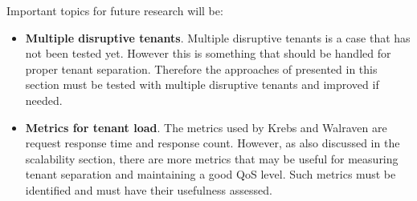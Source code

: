 Important topics for future research will be:
\begin{itemize}
	\item \textbf{Multiple disruptive tenants}.
		Multiple disruptive tenants is a case that has not been tested yet. 
		However this is something that should be handled for proper tenant separation.
		Therefore the approaches of presented in this section must be tested with multiple disruptive tenants and improved if needed.
	\item \textbf{Metrics for tenant load}.
		The metrics used by Krebs and Walraven are request response time and response count. 
		However, as also discussed in the scalability section, there are more metrics that may be useful for measuring tenant separation and maintaining a good \ac{QoS} level. Such metrics must be identified and must have their usefulness assessed.
\end{itemize}

